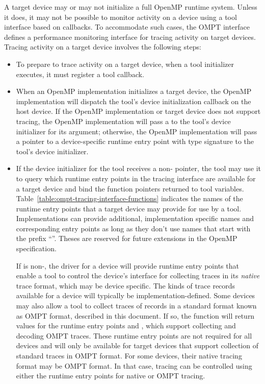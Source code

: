 A target device may or may not initialize a full OpenMP runtime system.
Unless it does, it may not be possible to monitor activity 
on a device using a tool interface based on callbacks.
To accommodate such cases, the OMPT interface defines 
a performance monitoring interface for tracing activity on target
devices. Tracing activity on a target device involves the following
steps:

\begin{itemize}
\item To prepare to trace activity on a target device, when a tool
  initializer executes, it must register a tool 
   callback.
\item When an OpenMP implementation initializes a target device, the
  OpenMP implementation will dispatch the tool's device initialization
  callback on the host device. If the OpenMP implementation or target device does not support tracing, 
  the OpenMP implementation will pass a  to the tool's device initializer for its
   argument; otherwise, the OpenMP implementation will pass 
  a pointer to a device-specific runtime entry point with type 
  signature  to the tool's device initializer. 
\item If the device initializer for the tool receives a
  non-  pointer, the tool may use it to query
  which runtime entry points in the tracing interface are available for a target device
  and bind the function pointers returned to tool variables.
  Table~\ref{table:ompt-tracing-interface-functions} indicates the
  names of the runtime entry points that a target device may provide for use
  by a tool.  
  Implementations
can provide additional, implementation specific names and corresponding
entry points as long as they don't use names that start with the prefix
``''. Theses are reserved for future extensions in the 
OpenMP specification.

  If  is non-, the driver for a device will
  provide runtime entry points that enable a tool to control the device's
  interface for collecting traces in its \emph{native} trace format,
  which may be device specific.  
  The kinds of trace records available for a device will typically be
  implementation-defined.
  Some devices may also allow a tool to
  collect traces of records in a standard format known as OMPT format,
  described in this document. If so, the  function will
  return values for the runtime entry points 
   and , which support
  collecting and decoding OMPT traces. 
  These runtime entry points are not required for all devices and will only be available for target devices that support 
  collection of standard traces in OMPT format.
  For some devices, their native
  tracing format may be OMPT format. In that case, tracing can be
  controlled using either the runtime entry points for native or OMPT
  tracing.


\end{itemize}
